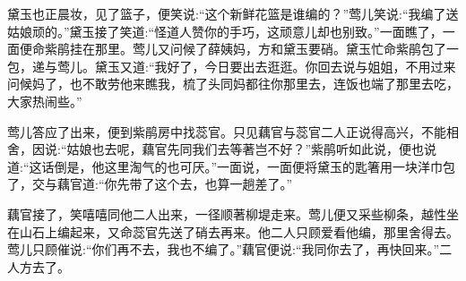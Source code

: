 \begin{parag}
    黛玉也正晨妆，见了篮子，便笑说:“这个新鲜花篮是谁编的？”莺儿笑说:“我编了送姑娘顽的。”黛玉接了笑道:“怪道人赞你的手巧，这顽意儿却也别致。”一面瞧了，一面便命紫鹃挂在那里。莺儿又问候了薛姨妈，方和黛玉要硝。黛玉忙命紫鹃包了一包，递与莺儿。黛玉又道:“我好了，今日要出去逛逛。你回去说与姐姐，不用过来问候妈了，也不敢劳他来瞧我，梳了头同妈都往你那里去，连饭也端了那里去吃，大家热闹些。”
\end{parag}


\begin{parag}
    莺儿答应了出来，便到紫鹃房中找蕊官。只见藕官与蕊官二人正说得高兴，不能相舍，因说:“姑娘也去呢，藕官先同我们去等著岂不好？”紫鹃听如此说，便也说道:“这话倒是，他这里淘气的也可厌。”一面说，一面便将黛玉的匙箸用一块洋巾包了，交与藕官道:“你先带了这个去，也算一趟差了。”
\end{parag}


\begin{parag}
    藕官接了，笑嘻嘻同他二人出来，一径顺著柳堤走来。莺儿便又采些柳条，越性坐在山石上编起来，又命蕊官先送了硝去再来。他二人只顾爱看他编，那里舍得去。莺儿只顾催说:“你们再不去，我也不编了。”藕官便说:“我同你去了，再快回来。”二人方去了。
\end{parag}



